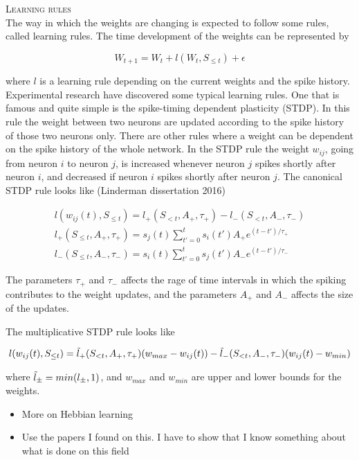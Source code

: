 \textsc{Learning rules}\\
The way in which the weights are changing is expected to follow some rules, called learning rules. The time development of the weights can be represented by

\begin{equation}
    W_{t+1} = W_t + l(W_t, S_{\leq t}) + \epsilon
\end{equation}

where $l$ is a learning rule depending on the current weights and the spike history. Experimental research have discovered some typical learning rules. One that is famous and quite simple is the spike-timing dependent plasticity (STDP). %
In this rule the weight between two neurons are updated according to the spike history of those two neurons only. There are other rules where a weight can be dependent on the spike history of the whole network. In the STDP rule the weight $w_{ij}$, going from neuron $i$ to neuron $j$, is increased whenever neuron $j$ spikes shortly after neuron $i$, and decreased if neuron $i$ spikes shortly after neuron $j$. The canonical STDP rule looks like (Linderman dissertation 2016)

\begin{equation}
    \begin{split}
    l(w_{ij}(t), S_{\leq t}) = l_+(S_{<t}, A_+,\tau_+) - l_-(S_{<t}, A_-,\tau_-)\\ 
    l_+(S_{\leq t}, A_+,\tau_+) = s_j(t) \sum_{t'=0}^{t} s_i(t') A_+ e^{(t-t')/\tau_+}\\ 
    l_-(S_{\leq t}, A_-,\tau_-) = s_i(t) \sum_{t'=0}^{t} s_j(t') A_- e^{(t-t')/\tau_-}
    \end{split}
\end{equation}

The parameters $\tau_+$ and $\tau_-$ affects the rage of time intervals in which the spiking contributes to the weight updates, and the parameters $A_+$ and $A_-$ affects the size of the updates. 

The multiplicative STDP rule looks like

\begin{equation}
    l(w_{ij}(t), S_{\leq t}) = \Tilde{l}_+(S_{<t}, A_+,\tau_+)(w_{max} - w_{ij}(t))  - \Tilde{l}_-(S_{<t}, A_-,\tau_-)(w_{ij}(t) - w_{min})
\end{equation}

where $\Tilde{l}_{\pm} = min(l_{\pm},1)$, and $w_{max}$ and $w_{min}$ are upper and lower bounds for the weights.

\begin{itemize}
    \item More on Hebbian learning
    \item Use the papers I found on this. I have to show that I know something about what is done on this field
\end{itemize}




\cleardoublepage